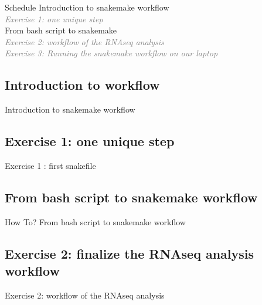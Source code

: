 \documentclass{beamer}
\begin{document}
\frame{\titlepage}

\begin{frame}{Schedule}
Introduction to snakemake workflow\\
\quad \quad \textcolor{gray}{\it Exercise 1: one unique step}\\
From bash script to snakemake\\
\quad \quad \textcolor{gray}{\it Exercise 2: workflow of the RNAseq analysis}\\
\quad \quad \textcolor{gray}{\it Exercise 3: Running the snakemake workflow on our laptop}\\
\end{frame}

\subsection[WorkflowIntro]{Introduction to workflow}
\begin{frame}{}
    \huge{Introduction to snakemake workflow}
\end{frame}


\subsection[SnakemakeEx1]{Exercise 1: one unique step}
\begin{frame}{}
    \huge{Exercise 1 : first snakefile}
\end{frame}


\subsection[bash2snakemake]{From bash script to snakemake workflow}
\begin{frame}{How To?}
    \huge{From bash script to snakemake workflow}
\end{frame}


\subsection[SnakemakeEx2]{Exercise 2: finalize the RNAseq analysis workflow}
\begin{frame}{}
    \huge{Exercise 2: workflow of the RNAseq analysis}
\end{frame}



\end{document}
